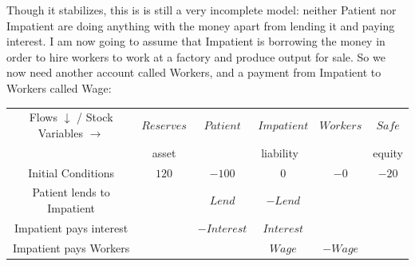 \begin{center}
\end{center}

Though it stabilizes, this is is still a very incomplete model:
neither Patient nor Impatient are doing anything with the money apart
from lending it and paying interest. I am now going to assume that
Impatient is borrowing the money in order to hire workers to work at a
factory and produce output for sale. So we now need another account
called Workers, and a payment from Impatient to Workers called Wage:

{
  \noindent
\small
\begin{tabular}{|c|ccccc|}
\hline
Flows $\downarrow$ / Stock Variables $\rightarrow$&\multicolumn{1}{|c|}{$Reserves$}&\multicolumn{1}{|c|}{$Patient$}&\multicolumn{1}{|c|}{$Impatient$}&\multicolumn{1}{|c|}{$Workers$}&\multicolumn{1}{|c|}{$Safe$}\\\cline{2-6}&\multicolumn{1}{|c|}{asset}&\multicolumn{3}{|c|}{liability}&\multicolumn{1}{|c|}{equity}\\\hline
Initial Conditions&$120$&$-100$&$0$&$-0$&$-20$\\
Patient lends to Impatient&&$Lend$&$-Lend$&&\\
Impatient pays interest&&$-Interest$&$Interest$&&\\
Impatient pays Workers&&&$Wage$&$-Wage$&\\
\hline
\end{tabular}
}

